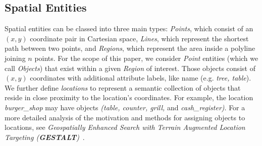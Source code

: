\subsection{Spatial Entities}
\par{
    Spatial entities can be classed into three main types: \textit{Points}, which consist of an $(x,y)$ coordinate pair in Cartesian space, \textit{Lines}, which represent the shortest path between two points, and \textit{Regions}, which represent the area inside a polyline joining $n$ points. %
    For the scope of this paper, we consider \textit{Point} entities (which we call  \textit{Objects}) that exist within a given \textit{Region} of interest.
    Those objects consist of $(x,y)$ coordinates with additional attribute labels, like name (e.g. \textit{tree, table}).
    We further define \textit{locations} to represent a semantic collection of objects that reside in close proximity to the location's coordinates. 
    For example, the location \textit{burger\_shop} may have objects \textit{(table, counter, grill,} and \textit{cash\_register)}.
    For a more detailed analysis of the motivation and methods for assigning objects to locations, see \textit{Geospatially Enhanced Search with Terrain Augmented Location Targeting (\textbf{GESTALT})}~\cite{Osul2023}.
}


